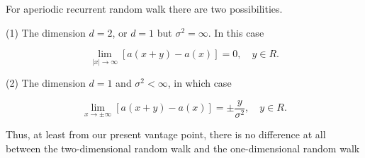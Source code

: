 For aperiodic recurrent random walk there are two possibilities.

(1) The dimension $d = 2$, or $d = 1$ but $\sigma^2 = \infty$. In this case

$$\lim_{|x| \to \infty} [a(x + y) - a(x)] = 0, \quad y \in R.$$

(2) The dimension $d = 1$ and $\sigma^2 < \infty$, in which case

$$\lim_{x \to \pm \infty} [a(x + y) - a(x)] = \pm \frac{y}{\sigma^2}, \quad y \in R.$$

Thus, at least from our present vantage point, there is no difference at all between the two-dimensional random walk and the one-dimensional random walk